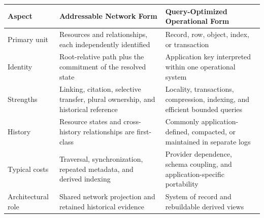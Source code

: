 \begin{tabularx}{\textwidth}{@{}P{0.18\textwidth}XX@{}}
\toprule
\textbf{Aspect} & \textbf{Addressable Network Form} & \textbf{Query-Optimized Operational Form} \\
\midrule
Primary unit & Resources and relationships, each independently identified & Record, row, object, index, or transaction \\
Identity & Root-relative path plus the commitment of the resolved state & Application key interpreted within one operational system \\
Strengths & Linking, citation, selective transfer, plural ownership, and historical reference & Locality, transactions, compression, indexing, and efficient bounded queries \\
History & Resource states and cross-history relationships are first-class & Commonly application-defined, compacted, or maintained in separate logs \\
Typical costs & Traversal, synchronization, repeated metadata, and derived indexing & Provider dependence, schema coupling, and application-specific portability \\
Architectural role & Shared network projection and retained historical evidence & System of record and rebuildable derived views \\
\bottomrule
\end{tabularx}
